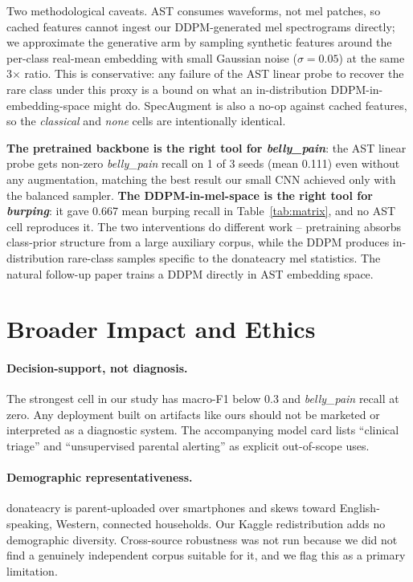 \documentclass[pmlr,twocolumn,10pt]{jmlr}
\begin{document}
Two methodological caveats. AST consumes waveforms, not mel patches, so cached features cannot ingest our DDPM-generated mel spectrograms directly; we approximate the generative arm by sampling synthetic features around the per-class real-mean embedding with small Gaussian noise ($\sigma{=}0.05$) at the same 3$\times$ ratio. This is conservative: any failure of the AST linear probe to recover the rare class under this proxy is a bound on what an in-distribution DDPM-in-embedding-space might do. SpecAugment is also a no-op against cached features, so the \textit{classical} and \textit{none} cells are intentionally identical.

\textbf{The pretrained backbone is the right tool for \textit{belly\_pain}}: the AST linear probe gets non-zero \textit{belly\_pain} recall on 1 of 3 seeds (mean 0.111) even without any augmentation, matching the best result our small CNN achieved only with the balanced sampler. \textbf{The DDPM-in-mel-space is the right tool for \textit{burping}}: it gave 0.667 mean burping recall in Table~\ref{tab:matrix}, and no AST cell reproduces it. The two interventions do different work -- pretraining absorbs class-prior structure from a large auxiliary corpus, while the DDPM produces in-distribution rare-class samples specific to the donateacry mel statistics. The natural follow-up paper trains a DDPM directly in AST embedding space.

\section{Broader Impact and Ethics}\label{sec:impact}
\paragraph{Decision-support, not diagnosis.} The strongest cell in our study has macro-F1 below 0.3 and \textit{belly\_pain} recall at zero. Any deployment built on artifacts like ours should not be marketed or interpreted as a diagnostic system. The accompanying model card lists ``clinical triage'' and ``unsupervised parental alerting'' as explicit out-of-scope uses.

\paragraph{Demographic representativeness.} donateacry is parent-uploaded over smartphones and skews toward English-speaking, Western, connected households. Our Kaggle redistribution adds no demographic diversity. Cross-source robustness was not run because we did not find a genuinely independent corpus suitable for it, and we flag this as a primary limitation.
\end{document}
